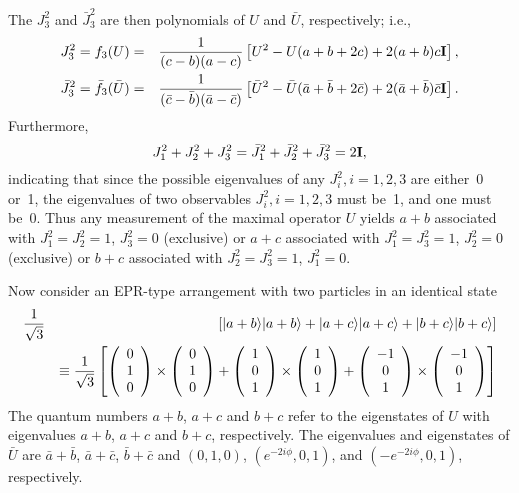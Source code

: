 The $J_3^2$ and $\bar J_3^2$ are then polynomials of $U$ and $\bar U$, respectively; i.e.,
\begin{eqnarray}
J_3^2 =f_3(U)&=&
 {1\over (c-b)(a-c)}\left[ U^2-U(a+b+2c)+2(a+b)c{\Bbb I}\right],\\
\bar J_3^2 =\bar f_3(\bar U)&=&
 {1\over (\bar c-\bar b)(\bar a-\bar c)}\left[ \bar U^2-\bar U(\bar
a+\bar b+2\bar c)+2(\bar a
+\bar b)\bar c{\Bbb I}\right].
\end{eqnarray}
Furthermore,
\begin{equation}
J_1^2+
J_2^2+
J_3^2=
\bar{J}_1^2+
\bar{J}_2^2+
\bar{J}_3^2 =2{\Bbb I},
\end{equation}
indicating that since the possible eigenvalues of any $J_i^2,
i=1,2,3$ are
either~0 or~1, the eigenvalues of two observables $J_i^2,i=1,2,3$ must
be~1, and one must be~0.
Thus any measurement of the
maximal operator $U$ yields
$a+b$ associated with $J_1^2=J_2^2=1$, $J_3^2=0$ (exclusive) or
$a+c$ associated with $J_1^2=J_3^2=1$, $J_2^2=0$ (exclusive) or
$b+c$ associated with $J_2^2=J_3^2=1$, $J_1^2=0$.



Now consider an EPR-type arrangement with two particles in an identical state
\begin{eqnarray}
{1\over \sqrt{3}}&&
\left[
\vert a+b\rangle \vert a+b\rangle
+
\vert a+c\rangle \vert a+c\rangle
+
\vert b+c\rangle \vert b+c\rangle
\right]
\label{eq-coun-in}
\\
&&
\equiv
{1\over \sqrt{3}}
\left[
\left(\begin{array}{c} 0\\1\\0\end{array}\right)
\times
\left(\begin{array}{c} 0\\1\\0\end{array}\right)
+
\left(\begin{array}{c} 1\\0\\1\end{array}\right)
\times
\left(\begin{array}{c} 1\\0\\1\end{array}\right)
+
\left(\begin{array}{c} -1\\0\\1\end{array}\right)
\times
\left(\begin{array}{c} -1\\0\\1\end{array}\right)
\right]
\nonumber
\end{eqnarray}
The quantum numbers $a+b$, $a+c$ and $b+c$ refer to
the eigenstates of $U$ with eigenvalues $a+b$, $a+c$ and $b+c$, respectively.
The eigenvalues and eigenstates  of $\bar U$  are $\bar a+\bar b$, $\bar a+\bar c$, $\bar b+\bar c$ and
$(0,1,0)$, $(e^{-2i\phi},0,1)$, and $(-e^{-2i\phi},0,1)$, respectively.


